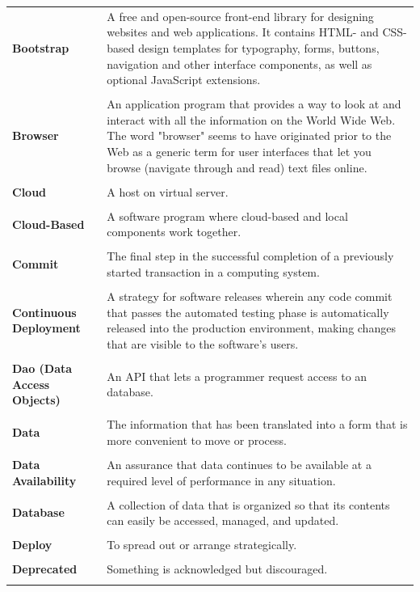 \documentclass[a4paper,11pt,twoside]{report}
\theoremstyle{definition}
\begin{document}
\begin{longtable}{p{4cm} p{11cm}}
\textbf{Bootstrap} & A free and open-source front-end library for designing websites and web applications. It contains HTML- and CSS-based design templates for typography, forms, buttons, navigation and other interface components, as well as optional JavaScript extensions. \\ \\
\textbf{Browser} & An application program that provides a way to look at and interact with all the information on the World Wide Web. The word "browser" seems to have originated prior to the Web as a generic term for user interfaces that let you browse (navigate through and read) text files online.\\ \\
\textbf{Cloud} & A host on virtual server.\\ \\
\textbf{Cloud-Based} & A software program where cloud-based and local components work together.\\ \\
\textbf{Commit} & The final step in the successful completion of a previously started transaction in a computing system.\\ \\
\textbf{Continuous Deployment} & A strategy for software releases wherein any code commit that passes the automated testing phase is automatically released into the production environment, making changes that are visible to the software's users.\\ \\
\textbf{Dao (Data Access Objects)} & An API that lets a programmer request access to an database.\\ \\
\textbf{Data} & The information that has been translated into a form that is more convenient to move or process.\\ \\
\textbf{Data Availability} & An assurance that data continues to be available at a required level of performance in any situation.\\ \\
\textbf{Database} & A collection of data that is organized so that its contents can easily be accessed, managed, and updated.\\ \\
\textbf{Deploy} & To spread out or arrange strategically.\\ \\
\textbf{Deprecated} & Something is acknowledged but discouraged.\\ \\

\end{longtable}
\end{document}
